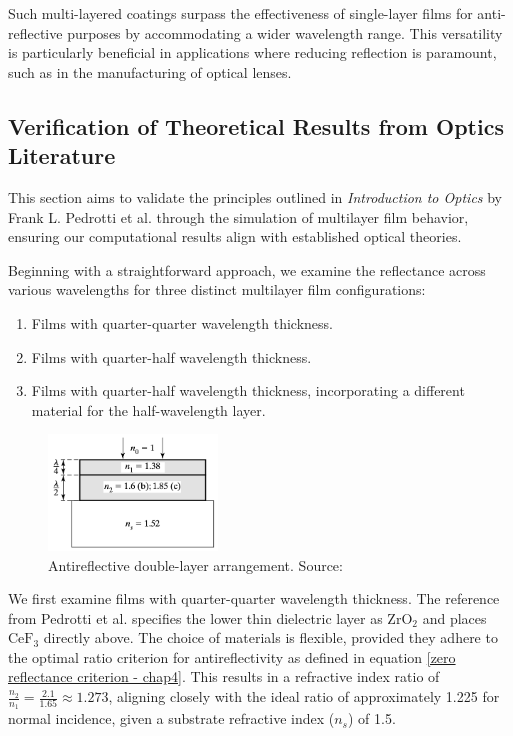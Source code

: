 Such multi-layered coatings surpass the effectiveness of single-layer films for anti-reflective purposes by accommodating a wider wavelength range. This versatility is particularly beneficial in applications where reducing reflection is paramount, such as in the manufacturing of optical lenses.

\subsection{Verification of Theoretical Results from Optics Literature}

This section aims to validate the principles outlined in \emph{Introduction to Optics} by Frank L. Pedrotti et al. through the simulation of multilayer film behavior, ensuring our computational results align with established optical theories.

Beginning with a straightforward approach, we examine the reflectance across various wavelengths for three distinct multilayer film configurations:
\begin{enumerate}
    \item Films with quarter-quarter wavelength thickness.
    \item Films with quarter-half wavelength thickness.
    \item Films with quarter-half wavelength thickness, incorporating a different material for the half-wavelength layer.
\end{enumerate}

\begin{figure}[ht!]
  \centering
  \includegraphics[width=0.4\textwidth]{Chapters/Figures/Chapter 4 Figures/Antireflecting Double Layer using Quarter and Half-Wavelength Thickness Films Layout.png}
  \caption{Antireflective double-layer arrangement. Source: \cite{pedrotti_introduction_2007}}
  \label{fig:antireflective_double_layer}
\end{figure}

We first examine films with quarter-quarter wavelength thickness. The reference from Pedrotti et al. specifies the lower thin dielectric layer as $\text{ZrO}_2$ and places $\text{CeF}_3$ directly above. The choice of materials is flexible, provided they adhere to the optimal ratio criterion for antireflectivity as defined in equation \ref{zero reflectance criterion - chap4}. This results in a refractive index ratio of $\frac{n_2}{n_1} = \frac{2.1}{1.65} \approx 1.273$, aligning closely with the ideal ratio of approximately 1.225 for normal incidence, given a substrate refractive index ($n_s$) of 1.5.


